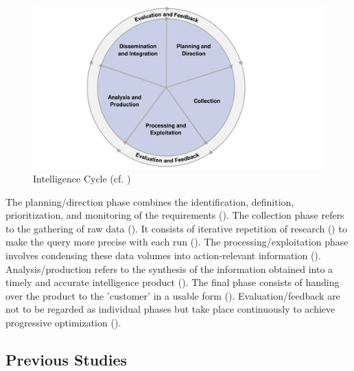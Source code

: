\documentclass[10pt]{article}
\begin{document}
\begin{figure}[h]
    \centering
    \includegraphics[clip,width=0.6\linewidth]{PDF/images/crop_Intelligence Cycle}
    \caption{Intelligence Cycle (cf. \textcite{JointChiefsofStaffU.S.Army.2013})}
    \label{fig: Intelligence Cycle}
\end{figure}

The planning/direction phase combines the identification, definition, prioritization, and monitoring
of the requirements (\cite{JointChiefsofStaffU.S.Army.2013}).
The collection phase refers to the gathering of raw data (\cite{CentralIntelligenceAgency.1987}).
It consists of iterative repetition of research
(\cite{NorthAtlanticTreatyOrganization.2001}) to make the query more precise with each run
(\cite{PastorGalindo.2020}). The processing/exploitation phase involves condensing
these data volumes into action-relevant information
(\cite{JointChiefsofStaffU.S.Army.2013}).
Analysis/production refers to the synthesis of the information obtained into a timely and accurate intelligence product
(\cite{NorthAtlanticTreatyOrganization.2001}).
The final phase consists of handing over the product to the 'customer' in a
usable form (\cite{CentralIntelligenceAgency.2023, Williams.2018}).
Evaluation/feedback are not to be regarded as individual phases
but take place continuously to achieve progressive optimization
(\cite{JointChiefsofStaffU.S.Army.2013, NorthAtlanticTreatyOrganization.2001}).

\subsection{Previous Studies}
\end{document}
